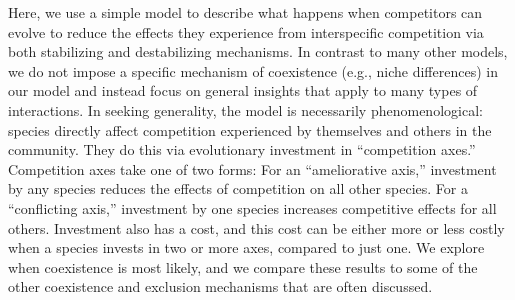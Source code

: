 Here, we use a simple model to describe what happens when competitors
can evolve to reduce the effects they experience from interspecific
competition via both stabilizing and destabilizing mechanisms.
In contrast to many other models, we do not impose a specific mechanism
of coexistence (e.g., niche differences) in our model and instead focus 
on general insights that apply to many types of interactions.
In seeking generality, the model is necessarily phenomenological:
species directly affect competition experienced by themselves and
others in the community.
They do this via evolutionary investment in ``competition axes.''
Competition axes take one of two forms: 
For an ``ameliorative axis,'' investment by any species reduces 
the effects of competition on all other species.
For a ``conflicting axis,'' investment by one species
increases competitive effects for all others.
Investment also has a cost, and this cost can be either more or less
costly when a species invests in two or more axes, compared to just one.
We explore when coexistence is most likely,
and we compare these results to some of the other coexistence and exclusion
mechanisms that are often discussed.

